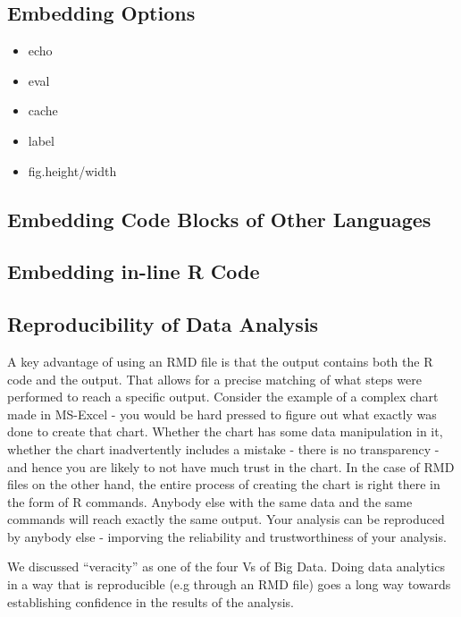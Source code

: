 \documentclass[]{krantz}
\providecommand{\tightlist}{%
  \setlength{\itemsep}{0pt}\setlength{\parskip}{0pt}}
\theoremstyle{definition}
\theoremstyle{definition}
\theoremstyle{definition}
\theoremstyle{remark}
\begin{document}
\subsection{Embedding Options}\label{embedding-options}

\begin{itemize}
\tightlist
\item
  echo
\item
  eval
\item
  cache
\item
  label
\item
  fig.height/width
\end{itemize}

\subsection{Embedding Code Blocks of Other
Languages}\label{embedding-code-blocks-of-other-languages}

\subsection{Embedding in-line R Code}\label{embedding-in-line-r-code}

\subsection{Reproducibility of Data
Analysis}\label{reproducibility-of-data-analysis}

A key advantage of using an RMD file is that the output contains both
the R code and the output. That allows for a precise matching of what
steps were performed to reach a specific output. Consider the example of
a complex chart made in MS-Excel - you would be hard pressed to figure
out what exactly was done to create that chart. Whether the chart has
some data manipulation in it, whether the chart inadvertently includes a
mistake - there is no transparency - and hence you are likely to not
have much trust in the chart. In the case of RMD files on the other
hand, the entire process of creating the chart is right there in the
form of R commands. Anybody else with the same data and the same
commands will reach exactly the same output. Your analysis can be
reproduced by anybody else - imporving the reliability and
trustworthiness of your analysis.

We discussed ``veracity'' as one of the four Vs of Big Data. Doing data
analytics in a way that is reproducible (e.g through an RMD file) goes a
long way towards establishing confidence in the results of the analysis.
\end{document}
